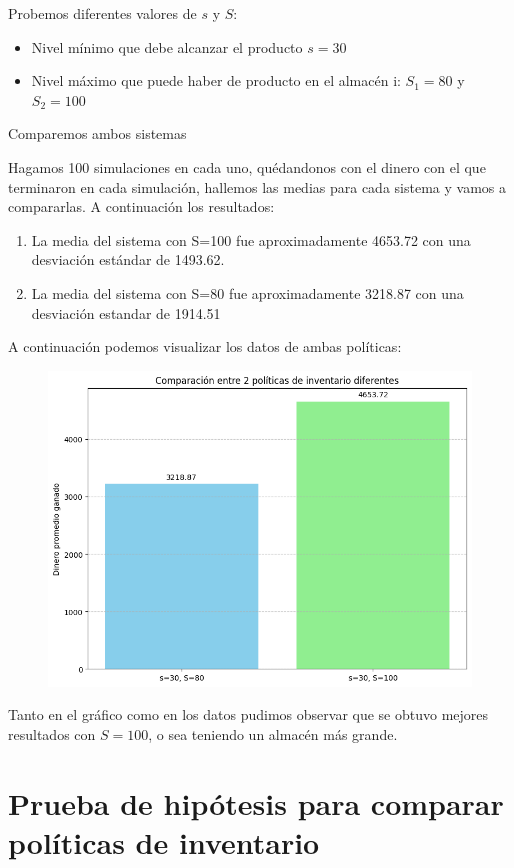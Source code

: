 \documentclass{article}
\begin{document}
\begin{itemize}
Probemos diferentes valores de $s$ y $S$:
\begin{itemize}
    \item Nivel mínimo que debe alcanzar el producto $s = 30$
    \item Nivel máximo que puede haber de producto en el almacén i:
    $S_1 = 80$ y $S_2 = 100$
\end{itemize}

Comparemos ambos sistemas

\vspace{\baselineskip}

Hagamos 100 simulaciones en cada uno, quédandonos con el dinero con el que terminaron en cada simulación, hallemos las medias para cada sistema y vamos a compararlas. A continuación los resultados:
\begin{enumerate}
    \item La media del sistema con {S=100} fue aproximadamente 4653.72 con una desviación estándar de 1493.62.
    \item La media del sistema con {S=80} fue aproximadamente 3218.87 con una desviación estandar de 1914.51
\end{enumerate}

A continuación podemos visualizar los datos de ambas políticas:

\begin{figure}[H]
    \centering
    \includegraphics[width=0.7\linewidth]{./output1.png}
    \label{fig:enter-label}
\end{figure}

Tanto en el gráfico como en los datos pudimos observar que se obtuvo mejores resultados con $S = 100$, o sea teniendo un almacén más grande.\\

\section*{Prueba de hipótesis para comparar políticas de inventario}


\end{itemize}
\end{document}
